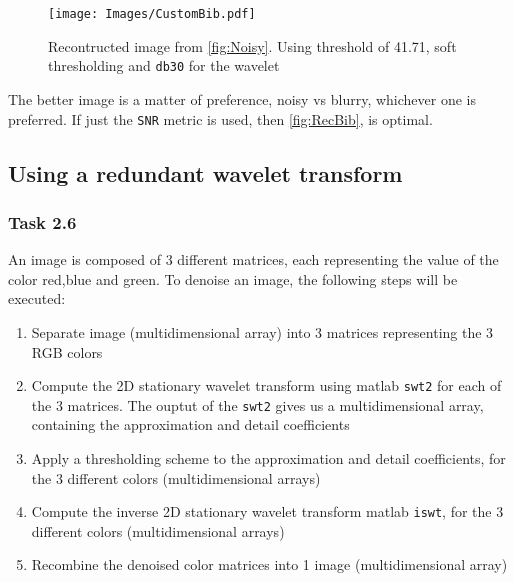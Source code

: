 \documentclass[a4paper]{article}
\begin{document}
    \begin{figure}[H]
	\centering
	\texttt{[image: Images/CustomBib.pdf]}
	\caption{Recontructed image from \cref{fig:Noisy}. Using threshold of 41.71, soft thresholding and \texttt{db30} for the wavelet}
	\label{fig:CusBib}
\end{figure}
	
	The better image is a matter of preference, noisy vs blurry, whichever one is preferred. If just the \texttt{SNR} metric is used, then \cref{fig:RecBib}, is optimal.
	

	
	
    \subsection{Using a redundant wavelet transform}

    \subsubsection{Task 2.6}

	An image is composed of 3 different matrices, each representing the value of the color red,blue and green. To denoise an image, the following steps will be executed:
\begin{enumerate}
	\item Separate image (multidimensional array) into 3 matrices representing the 3 RGB colors
	\item Compute the 2D stationary wavelet transform using matlab \texttt{swt2} for each of the 3 matrices. The ouptut of the \texttt{swt2} gives us a multidimensional array, containing the approximation and detail coefficients
	\item Apply a thresholding scheme to the approximation and detail coefficients, for the 3 different colors (multidimensional arrays)
	\item Compute the inverse 2D stationary wavelet transform matlab \texttt{iswt}, for the 3 different colors (multidimensional arrays)
	\item Recombine the denoised color matrices into 1 image (multidimensional array)
\end{enumerate}
\end{document}
